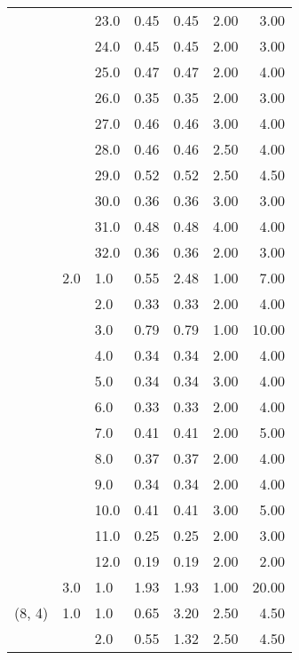 \begin{tabular}{lllrrrr}
       &     & 23.0 &       0.45 &      0.45 & 2.00 &   3.00 \\
       &     & 24.0 &       0.45 &      0.45 & 2.00 &   3.00 \\
       &     & 25.0 &       0.47 &      0.47 & 2.00 &   4.00 \\
       &     & 26.0 &       0.35 &      0.35 & 2.00 &   3.00 \\
       &     & 27.0 &       0.46 &      0.46 & 3.00 &   4.00 \\
       &     & 28.0 &       0.46 &      0.46 & 2.50 &   4.00 \\
       &     & 29.0 &       0.52 &      0.52 & 2.50 &   4.50 \\
       &     & 30.0 &       0.36 &      0.36 & 3.00 &   3.00 \\
       &     & 31.0 &       0.48 &      0.48 & 4.00 &   4.00 \\
       &     & 32.0 &       0.36 &      0.36 & 2.00 &   3.00 \\
       & 2.0 & 1.0  &       0.55 &      2.48 & 1.00 &   7.00 \\
       &     & 2.0  &       0.33 &      0.33 & 2.00 &   4.00 \\
       &     & 3.0  &       0.79 &      0.79 & 1.00 &  10.00 \\
       &     & 4.0  &       0.34 &      0.34 & 2.00 &   4.00 \\
       &     & 5.0  &       0.34 &      0.34 & 3.00 &   4.00 \\
       &     & 6.0  &       0.33 &      0.33 & 2.00 &   4.00 \\
       &     & 7.0  &       0.41 &      0.41 & 2.00 &   5.00 \\
       &     & 8.0  &       0.37 &      0.37 & 2.00 &   4.00 \\
       &     & 9.0  &       0.34 &      0.34 & 2.00 &   4.00 \\
       &     & 10.0 &       0.41 &      0.41 & 3.00 &   5.00 \\
       &     & 11.0 &       0.25 &      0.25 & 2.00 &   3.00 \\
       &     & 12.0 &       0.19 &      0.19 & 2.00 &   2.00 \\
       & 3.0 & 1.0  &       1.93 &      1.93 & 1.00 &  20.00 \\
(8, 4) & 1.0 & 1.0  &       0.65 &      3.20 & 2.50 &   4.50 \\
       &     & 2.0  &       0.55 &      1.32 & 2.50 &   4.50 \\

\end{tabular}
